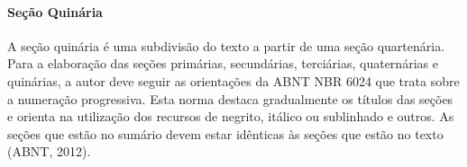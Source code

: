 \textopadrao

\textopadrao

\paragraph{Seção Quinária}

A seção quinária é uma subdivisão do texto a partir de uma seção quartenária.
Para a elaboração das seções primárias, secundárias, terciárias, quaternárias
e quinárias, a autor deve seguir as orientações da ABNT NBR 6024 que trata
sobre a numeração progressiva. Esta norma destaca gradualmente os títulos das
seções e orienta na utilização dos recursos de negrito, itálico ou sublinhado
e outros. As seções que estão no sumário devem estar idênticas às seções que
estão no texto (ABNT, 2012).

\textopadrao

\textopadrao
